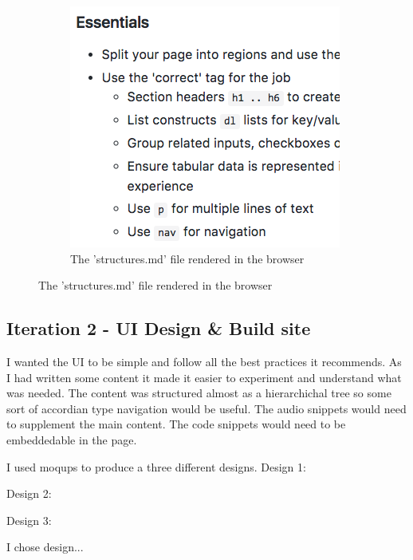 \begin{figure}[H]
    \qquad
    \begin{subfigure}[b]{0.4\textwidth}
        \includegraphics[width=\textwidth]{figures/documentation_md_example_2}
        \captionsetup{justification=centering}
        \caption{The 'structures.md' file rendered in the browser}
        \label{fig:structures}
    \end{subfigure}
\end{figure}

\subsection{Iteration 2 - UI Design \& Build site}
I wanted the UI to be simple and follow all the best practices it recommends.
As I had written some content it made it easier to experiment and understand
what was needed. The content was structured almost as a hierarchichal tree so
some sort of accordian type navigation would be useful. The audio snippets
would need to supplement the main content. The code snippets
would need to be embeddedable in the page.

I used moqups to produce a three different designs.
Design 1:

Design 2:

Design 3:

I chose design...

